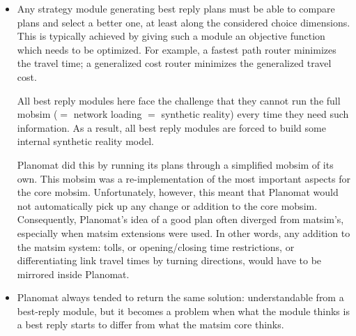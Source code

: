 \begin{itemize}\styleItemize
\item Any strategy module generating best reply plans must be able to compare plans and select a better one, at least along the considered choice dimensions. This is typically achieved by giving such a module an objective function which needs to be optimized. For example, a fastest path router minimizes the travel time; a generalized cost router minimizes the generalized travel cost.

All best reply modules here face the challenge that they cannot run the full \gls{mobsim} ($=$ network loading $=$ synthetic reality) every time they need such information. As a result, all best reply modules are forced to build some internal synthetic reality model.  

Planomat did this by running its plans through a simplified \gls{mobsim} of its own. This \gls{mobsim} was a re-implementation of the most important aspects for the core \gls{mobsim}.
%
%
Unfortunately, however, this meant that Planomat would not automatically pick up any change or addition to the core \gls{mobsim}.
%
Consequently,  Planomat's idea of a good plan often diverged from \gls{matsim}'s, especially when \gls{matsim} extensions were used.
%
In other words, any addition to the \gls{matsim} system: \eg tolls, or opening/closing time restrictions, or differentiating link travel times by turning directions, would have to be mirrored inside Planomat.
%
\item Planomat always tended to return the same solution: understandable from a best-reply module, but it becomes a problem when what the module thinks is a best reply starts to differ from what the \gls{matsim} core thinks.  


\end{itemize}
